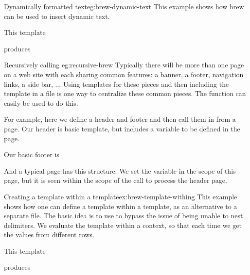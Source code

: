 \begin{example}{Dynamically formatted text}{eg:brew-dynamic-text}
  This example shows how brew can be used to insert dynamic text.

This template


produces


\end{example}

\begin{example}{Recursively calling }{eg:recursive-brew}
  Typically there will be more than one page on a web site with each
  sharing common features: a banner, a footer, navigation links, a
  side bar, ... Using templates for these pieces and then including
  the template in a file is one way to centralize these common
  pieces. The  function can easily be used to do this.
  
  For example, here we define a header and footer and then call them
  in from a page. Our header is basic template, but includes a
  variable  to be defined in the page.
  

  Our basic footer is
  

  And a typical page has this structure. We set the variable
   in the scope of this page, but it is seen within the
  scope of the call to process the header page.
  
  
  
\end{example}


\begin{example}{Creating a template within a template}{ex:brew-template-withing}
  This example shows how one can define a template within a template,
  as an alternative to a separate file. The basic idea is to use
   to bypass the issue of being unable to nest
   delimiters. We evaluate the template within a context, so
  that each time we get the values from different rows.

This template

 produces
 
\end{example}


